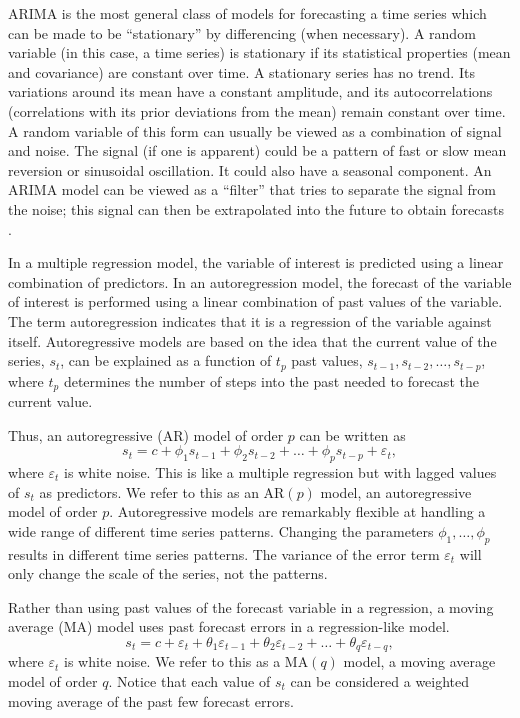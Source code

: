 ARIMA is the most general class of models for forecasting a time series which can be made to be ``stationary'' by differencing (when necessary). A random variable (in this case, a time series) is stationary if its statistical properties (mean and covariance) are constant over time.  A stationary series has no trend. Its variations around its mean have a constant amplitude, and its autocorrelations (correlations with its prior deviations from the mean) remain constant over time.  A random variable of this form can usually be viewed as a combination of signal and noise. The signal (if one is apparent) could be a pattern of fast or slow mean reversion or sinusoidal oscillation. It could also have a seasonal component. An ARIMA model can be viewed as a ``filter'' that tries to separate the signal from the noise; this signal can then be extrapolated into the future to obtain forecasts \cite{Chatfield2019}.

In a multiple regression model, the variable of interest is predicted using a linear combination of predictors. In an autoregression model, the forecast of the variable of interest is performed using a linear combination of past values of the variable. The term autoregression indicates that it is a regression of the variable against itself. Autoregressive models are based on the idea that the current value of the series, $s_{t}$, can be explained as a function of $t_{p}$ past values, $s_{t-1}, s_{t-2}, \ldots, s_{t-p}$, where $t_{p}$ determines the number of steps into the past needed to forecast the current value. 

Thus, an autoregressive (AR) model of order $p$ can be written as 
\begin{equation}
    \label{Eq:AR_p}
    s_{t} = c + \phi_{1} s_{t-1} + \phi_{2} s_{t-2} + \ldots +\phi_{p}s_{t-p} + \varepsilon_{t},
\end{equation} where $\varepsilon_{t}$ is white noise. This is like a multiple regression but with lagged values of $s_{t}$ as predictors. We refer to this as an AR$(p)$ model, an autoregressive model of order $p$. Autoregressive models are remarkably flexible at handling a wide range of different time series patterns. Changing the parameters $\phi_{1},\ldots, \phi_{p}$ results in different time series patterns. The variance of the error term $\varepsilon_{t}$ will only change the scale of the series, not the patterns.

Rather than using past values of the forecast variable in a regression, a moving average (MA) model uses past forecast errors in a regression-like model. 
\begin{equation}
    \label{Eq:MA_q}
    s_{t} = c + \varepsilon_{t} + \theta_{1} \varepsilon_{t-1} + \theta_{2}\varepsilon_{t-2} + \ldots + \theta_{q} \varepsilon_{t-q},    
\end{equation}
 where $\varepsilon_{t}$ is white noise. We refer to this as a MA$(q)$ model, a moving average model of order $q$. Notice that each value of $s_{t}$ can be considered a weighted moving average of the past few forecast errors.

